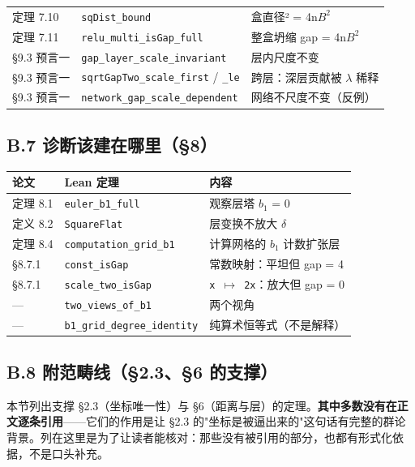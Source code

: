 \documentclass[11pt,a4paper]{ctexart}
\begin{document}
\begin{center}
\begin{tabular}{lll}
定理 7.10 & \texttt{sqDist\_bound} & 盒直径² = 4n\ensuremath{B^{2}} \\
定理 7.11 & \texttt{relu\_multi\_isGap\_full} & 整盒坍缩 gap = 4n\ensuremath{B^{2}} \\
§9.3 预言一 & \texttt{gap\_layer\_scale\_invariant} & 层内尺度不变 \\
§9.3 预言一 & \texttt{sqrtGapTwo\_scale\_first} / \texttt{\_le} & 跨层：深层贡献被 \ensuremath{\lambda} 稀释 \\
§9.3 预言一 & \texttt{network\_gap\_scale\_dependent} & 网络不尺度不变（反例） \\
\bottomrule
\end{tabular}
\end{center}

\subsection{B.7 诊断该建在哪里（§8）}

\begin{center}\small
\begin{tabular}{lll}
\toprule
论文 & Lean 定理 & 内容 \\
\midrule
定理 8.1 & \texttt{euler\_b1\_full} & 观察层塔 \ensuremath{b_{1}} = 0 \\
定义 8.2 & \texttt{SquareFlat} & 层变换不放大 \ensuremath{\delta} \\
定理 8.4 & \texttt{computation\_grid\_b1} & 计算网格的 \ensuremath{b_{1}} 计数扩张层 \\
§8.7.1 & \texttt{const\_isGap} & 常数映射：平坦但 gap = 4 \\
§8.7.1 & \texttt{scale\_two\_isGap} & \texttt{x \ensuremath{\mapsto} 2x}：放大但 gap = 0 \\
— & \texttt{two\_views\_of\_b1} & 两个视角 \\
— & \texttt{b1\_grid\_degree\_identity} & 纯算术恒等式（不是解释） \\
\bottomrule
\end{tabular}
\end{center}

\subsection{B.8 附范畴线（§2.3、§6 的支撑）}

本节列出支撑 §2.3（坐标唯一性）与 §6（距离与层）的定理。\textbf{其中多数没有在正文逐条引用}——它们的作用是让 §2.3 的"坐标是被逼出来的"这句话有完整的群论背景。列在这里是为了让读者能核对：那些没有被引用的部分，也都有形式化依据，不是口头补充。
\end{document}
